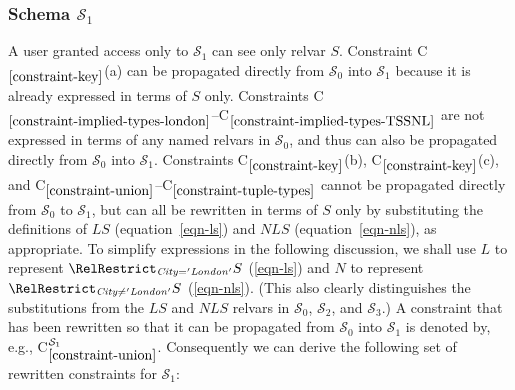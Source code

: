 \documentclass{sig-alternate-05-2015}
\newcounter{constraint}
\newcommand{\LS}{\ensuremath{\mathit{LS}}}
\newcommand{\NLS}{\ensuremath{\mathit{NLS}}}
\newcommand{\LSsub}{\ensuremath{\mathit{L}}}
\newcommand{\NLSsub}{\ensuremath{\mathit{N}}}
\newcommand{\City}{\ensuremath{\mathit{City}}}
\newcommand{\SC}[1]{\ensuremath{\mathcal{S}_{#1}}}
\newcommand{\Constraint}[2][]{C\ensuremath{_{#2}\ifx&#1&\else^{#1}\fi}}
\begin{document}




\subsubsection{Schema \(\SC{1}\)}
\label{sec-constraints-s-i}

\noindent A user granted access only to \(\SC{1}\) can see only relvar \(S\). Constraint \Constraint{\ref{constraint-key}}(a) can be propagated directly from \(\SC{0}\) into \(\SC{1}\) because it is already expressed in terms of \(S\) only. Constraints \Constraint{\ref{constraint-implied-types-london}}--\Constraint{\ref{constraint-implied-types-TSSNL}} are not expressed in terms of any named relvars in \(\SC{0}\), and thus can also be propagated directly from \(\SC{0}\) into \(\SC{1}\). Constraints \Constraint{\ref{constraint-key}}(b), \Constraint{\ref{constraint-key}}(c), and \Constraint{\ref{constraint-union}}--\Constraint{\ref{constraint-tuple-types}} cannot be propagated directly from \(\SC{0}\) to \(\SC{1}\), but can all be rewritten in terms of \(S\) only by substituting the definitions of \(\LS\) (equation~\ref{eqn-ls}) and \(\NLS\) (equation~\ref{eqn-nls}), as appropriate. To simplify expressions in the following discussion, we shall use \(\LSsub\) to represent \(\RelRestrict_{\City = \mathit{'London'}}S\) (\ref{eqn-ls}) and \(\NLSsub\) to represent \(\RelRestrict_{\City \ne \mathit{'London'}}S\) (\ref{eqn-nls}). (This also clearly distinguishes the substitutions from the \(\LS\) and \(\NLS\) relvars in \(\SC{0}\), \(\SC{2}\), and \(\SC{3}\).) A constraint that has been rewritten so that it can be propagated from \(\SC{0}\) into \(\SC{1}\) is denoted by, e.g., \Constraint[\SC{1}]{\ref{constraint-union}}. Consequently we can derive the following set of rewritten constraints for \(\SC{1}\):
\end{document}
